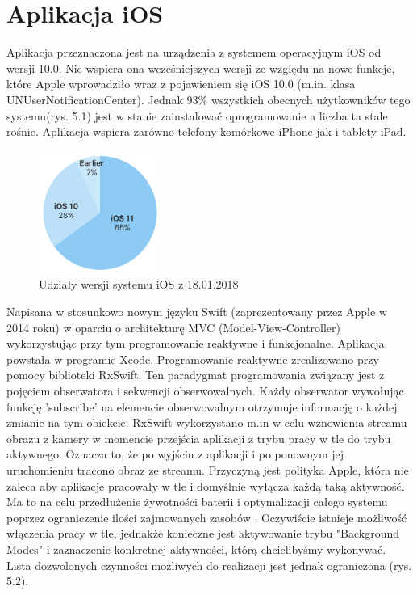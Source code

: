 \section{Aplikacja iOS}
Aplikacja przeznaczona jest na urządzenia z systemem operacyjnym iOS od wersji 10.0. 
Nie wspiera ona wcześniejszych wersji ze względu na nowe funkcje, które Apple wprowadziło wraz z pojawieniem się iOS 10.0 (m.in. klasa UNUserNotificationCenter). Jednak 93\% wszystkich obecnych użytkowników tego systemu(rys. 5.1) jest w stanie zainstalować oprogramowanie a liczba ta stale rośnie. Aplikacja wspiera zarówno telefony komórkowe iPhone jak i tablety iPad. 
\begin{figure}[ht]
	\centering
	\includegraphics[width=4cm]{ios_screenshots/iOSstat.png}
	\caption{Udziały wersji systemu iOS z 18.01.2018 \protect\cite{iosversions}}
\end{figure}
Napisana w stosunkowo nowym języku Swift (zaprezentowany przez Apple w 2014 roku) w oparciu o architekturę MVC (Model-View-Controller) wykorzystując przy tym programowanie reaktywne i funkcjonalne. Aplikacja powstała w programie Xcode. Programowanie reaktywne zrealizowano przy pomocy biblioteki RxSwift. Ten paradygmat programowania związany jest z pojęciem obserwatora i sekwencji obserwowalnych. Każdy obserwator wywołując funkcję 'subscribe' na elemencie obserwowalnym otrzymuje informację o każdej zmianie na tym obiekcie. RxSwift wykorzystano m.in w celu wznowienia streamu obrazu z kamery w momencie przejścia aplikacji z trybu pracy w tle do trybu aktywnego. Oznacza to, że po wyjściu z aplikacji i po ponownym jej uruchomieniu tracono obraz ze streamu. Przyczyną jest polityka Apple, która nie zaleca aby aplikacje pracowały w tle i domyślnie wyłącza każdą taką aktywność. Ma to na celu przedłużenie żywotności baterii i optymalizacji całego systemu poprzez ograniczenie ilości zajmowanych zasobów \cite{backgroundmodes}.  Oczywiście istnieje możliwość włączenia pracy w tle, jednakże konieczne jest aktywowanie trybu "Background Modes" i zaznaczenie konkretnej aktywności, którą chcielibyśmy wykonywać. Lista dozwolonych czynności możliwych do realizacji jest jednak ograniczona (rys. 5.2). 

